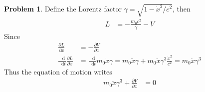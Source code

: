 \documentclass[twoside,11pt]{article}
\newcommand{\lms}{\fontfamily{lmss}\selectfont} %
\renewcommand*\d{\mathop{}\!\mathrm{d}}
\theoremstyle{definition}
\newtheorem{problem}{\lms Problem}
\theoremstyle{remark}
\begin{document}
\begin{problem}
Define the Lorentz factor $\gamma = \sqrt{1-\dot{x}^2/c^2}$, then
\begin{align*}
    L &= -\frac{m_0c^2}{\gamma} - V
\end{align*}
Since
\begin{align*}
    \frac{\partial L}{\partial x} &= -\frac{\partial V}{\partial x}\\
    \frac{\d}{\d t}\frac{\partial L}{\partial \dot{x}} &= 
    \frac{\d}{\d t}m_0\dot{x}\gamma = m_0\ddot{x}\gamma + m_0\ddot{x}\gamma^3\frac{\dot{x}^2}{c^2}
    = m_0\ddot{x}\gamma^3
\end{align*}
Thus the equation of motion writes
\begin{align*}
    m_0\ddot{x}\gamma^3 + \frac{\partial V}{\partial x} &= 0
\end{align*}

\end{problem}
\end{document}
